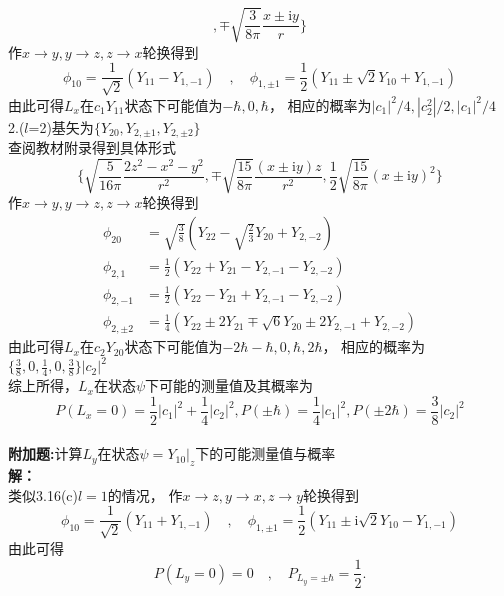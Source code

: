 \documentclass[a4paper]{article}
\begin{document}
\begin{CJK*}{UTF8}{song}
{$$        ,\mp\sqrt{\frac{3}{8\pi}}\frac{x\pm \mathrm{i}y}{r}\}$$
    \indent 作$x\rightarrow y,y\rightarrow z,z\rightarrow x$轮换得到
    $$\phi_{10}=\frac{1}{\sqrt{2}}(Y_{11}-Y_{1,-1})\quad,
        \quad\phi_{1,\pm1}=\frac{1}{2}(Y_{11}\pm \sqrt{2}Y_{10}+Y_{1,-1})$$
    \indent 由此可得$L_{x}$在$c_{1}Y_{11}$状态下可能值为$-\hbar,0,\hbar$，
        相应的概率为$|c_{1}|^{2}/4,|c_{2}^{2}|/2,|c_{1}|^{2}/4$\\
    2.($l$=2)基矢为$\{Y_{20},Y_{2,\pm1},Y_{2,\pm2}\}$\\
    \indent 查阅教材附录得到具体形式
    $$\{\sqrt{\frac{5}{16\pi}}\frac{2 z^{2}- x^{2}- y^{2}}{r^{2}}
        ,\mp\sqrt{\frac{15}{8\pi}}\frac{(x\pm \mathrm{i}y)z}{r^{2}}
        ,\frac{1}{2}\sqrt{\frac{15}{8\pi}}(x\pm \mathrm{i}y)^{2}\}$$
    \indent 作$x\rightarrow y,y\rightarrow z,z\rightarrow x$轮换得到
    \begin{equation*}\begin{split}
    \phi_{20} 
        & = \sqrt{\frac{3}{8}}(Y_{22}-\sqrt{\frac{2}{3}}Y_{20}+Y_{2,-2})\\
    \phi_{2,1} 
        & = \frac{1}{2}(Y_{22}+Y_{21}-Y_{2,-1}-Y_{2,-2})\\
    \phi_{2,-1}
        & = \frac{1}{2}(Y_{22}-Y_{21}+Y_{2,-1}-Y_{2,-2})\\
    \phi_{2,\pm 2}
        & = \frac{1}{4}(Y_{22}\pm2Y_{21}\mp\sqrt{6}Y_{20}\pm 2Y_{2,-1}+Y_{2,-2})      
    \end{split}\end{equation*}
    \indent 由此可得$L_{x}$在$c_{2}Y_{20}$状态下可能值为$-2\hbar-\hbar,0,\hbar,2\hbar$，
        相应的概率为$\{\displaystyle\frac{3}{8},0,\frac{1}{4},0,\frac{3}{8}\}|c_{2}|^{2}$\\
    综上所得，$L_{x}$在状态$\psi$下可能的测量值及其概率为
    $$
    P(L_{x}=0)=\frac{1}{2}|c_{1}|^{2}+\frac{1}{4}|c_{2}|^{2},
        P(\pm\hbar)=\frac{1}{4}|c_{1}|^{2},P(\pm2\hbar)=\frac{3}{8}|c_{2}|^{2}
        $$
    }\\[20pt]
    \noindent \textbf{附加题:}\quad 计算$L_{y}$在状态$\psi = Y_{10}|_{z}$下的可能测量值与概率\\[8pt]
    {
    \noindent\textbf{解：}\\
    类似3.16(c)$l=1$的情况，
        作$x\rightarrow z,y\rightarrow x,z\rightarrow y$轮换得到
    $$\phi_{10}=\frac{1}{\sqrt{2}}(Y_{11}+Y_{1,-1})\quad,
        \quad\phi_{1,\pm1}=\frac{1}{2}(Y_{11}\pm \mathrm{i}\sqrt{2}Y_{10}-Y_{1,-1})$$
    由此可得
    $$P(L_{y}=0)=0\quad,\quad P_{L_{y}=\pm\hbar}=\frac{1}{2}.$$
    }\\[40pt]     

\end{CJK*}
\end{document}
